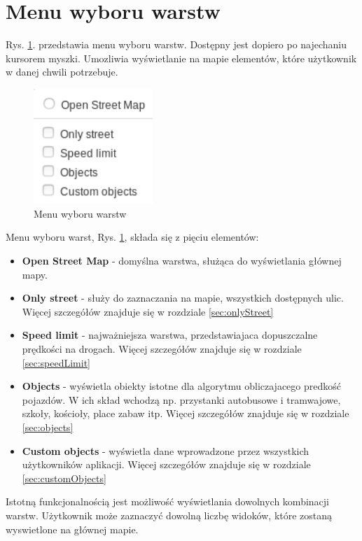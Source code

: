 \newpage

\section{Menu wyboru warstw}
\label{sec:layerMenu}

Rys. \ref{sec:mainView}. przedstawia menu wyboru warstw. Dostępny jest dopiero po najechaniu kursorem myszki. Umozliwia wyświetlanie na mapie elementów, które użytkownik w danej chwili potrzebuje. 

\begin{figure}[h]
\caption{Menu wyboru warstw}
\label{sec:mainView}
\centering
\includegraphics[width=0.4\textwidth]{layerMenu}
\end{figure}

Menu wyboru warst, Rys. \ref{sec:layerMenu}, składa się z pięciu elementów:
\begin{itemize}
\item \textbf{Open Street Map} - domyślna warstwa, służąca do wyświetlania głównej mapy.
\item \textbf{Only street} - służy do zaznaczania na mapie, wszystkich dostępnych ulic. Więcej szczegółów znajduje się w rozdziale \ref{sec:onlyStreet}
\item \textbf{Speed limit} - najważniejsza warstwa, przedstawiajaca dopuszczalne prędkości na drogach. Więcej szczegółów znajduje się w rozdziale \ref{sec:speedLimit}
\item \textbf{Objects} - wyświetla obiekty istotne dla algorytmu obliczajacego predkość pojazdów. W ich skład wchodzą np. przystanki autobusowe i tramwajowe, szkoły, kościoły, place zabaw itp. Więcej szczegółów znajduje się w rozdziale \ref{sec:objects}
\item \textbf{Custom objects} - wyświetla dane wprowadzone przez wszystkich użytkowników aplikacji. Więcej szczegółów znajduje się w rozdziale \ref{sec:customObjects}
\end{itemize}

Istotną funkcjonalnością jest możliwość wyświetlania dowolnych kombinacji warstw. Użytkownik może zaznaczyć dowolną liczbę widoków, które zostaną wyswietlone na głównej mapie.

